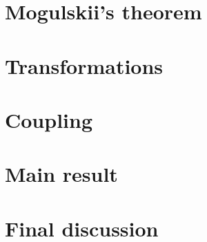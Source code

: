 

\section{Mogulskii's theorem}
\label{rate-functions:mogulskii}


\section{Transformations}
\label{rate-functions:transformations}


\section{Coupling}
\label{rate-functions:coupling}


\section{Main result}
\label{rate-functions:main}


\section{Final discussion}
\label{rate-functions:final}

